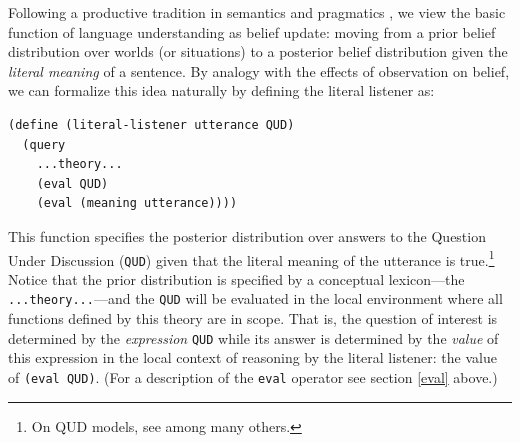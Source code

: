 \documentclass[12pt]{article}
\begin{document}
Following a productive tradition in semantics and pragmatics \citep[][etc.]{stalnaker78,lewis79,heim82}, we view the basic function of language understanding as belief update: moving from a prior belief distribution over worlds (or situations) to a posterior belief distribution given the \emph{literal meaning} of a sentence. 
By analogy with the effects of observation on belief, we can formalize this idea naturally by defining the literal listener as:
\begin{lstlisting}
(define (literal-listener utterance QUD)
  (query
    ...theory...
    (eval QUD)
    (eval (meaning utterance))))
\end{lstlisting}
This function specifies the posterior distribution over answers to the Question Under Discussion (\lstinline{QUD}) given that the literal meaning of the utterance is true.\footnote{On QUD models, see \citealt{ginzburg95a,vankuppevelt95,roberts96,beaverclark08} among many others.} Notice that the prior distribution is specified by a conceptual lexicon---the \lstinline{...theory...}---and the \lstinline{QUD} will be evaluated in the local environment where all functions defined by this theory are in scope. That is, the question of interest is determined by the \emph{expression} \lstinline{QUD} while its answer is determined by the \emph{value} of this expression in the local context of reasoning by the literal listener: the value of \lstinline{(eval QUD)}. (For a description of the \lstinline{eval} operator see section \ref{eval} above.)
\end{document}
